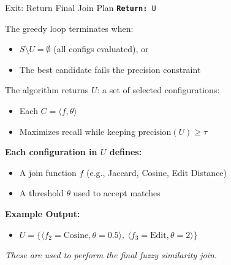 \documentclass[8pt]{beamer} %
\begin{document}
\begin{frame}{Exit: Return Final Join Plan}
	\texttt{\textbf{Return:} U}
	
	\vspace{0.5em}
	The greedy loop terminates when:
	\begin{itemize}
		\item $S \setminus U = \emptyset$ (all configs evaluated), or
		\item The best candidate fails the precision constraint
	\end{itemize}
	
	\vspace{0.5em}
	The algorithm returns $U$: a set of selected configurations:
	\begin{itemize}
		\item Each $C = \langle f, \theta \rangle$
		\item Maximizes recall while keeping $\text{precision}(U) \geq \tau$
	\end{itemize}
	
	\vspace{0.5em}
	\textbf{Each configuration in $U$ defines:}
	\begin{itemize}
		\item A join function $f$ (e.g., Jaccard, Cosine, Edit Distance)
		\item A threshold $\theta$ used to accept matches
	\end{itemize}
	
	\vspace{0.5em}
	\textbf{Example Output:}
	\begin{itemize}
		\item $U = \{ \langle f_2 = \text{Cosine}, \theta = 0.5 \rangle,\ \langle f_3 = \text{Edit}, \theta = 2 \rangle \}$
	\end{itemize}
	
	\textit{These are used to perform the final fuzzy similarity join.}
\end{frame}
\end{document}
